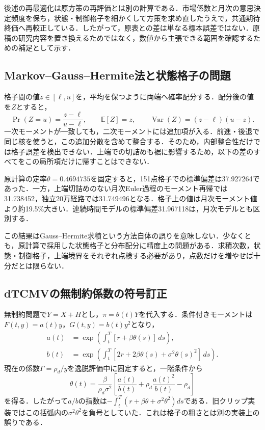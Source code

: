 \documentclass[10pt,a4paper]{article}
\theoremstyle{plain}
\theoremstyle{definition}
\newcommand{\E}{\mathbb{E}}
\DeclareMathOperator{\Var}{Var}
\begin{document}
後述の再最適化は原方策の再評価とは別の計算である．市場係数と月次の意思決定頻度を保ち，状態・制御格子を細かくして方策を求め直したうえで，共通期待終価へ再較正している．したがって，原表との差は単なる標本誤差ではない．原稿の研究内容を置き換えるためではなく，数値から主張できる範囲を確認するための補足として示す．

\subsection{Markov--Gauss--Hermite法と状態格子の問題}
格子間の値$z\in[\ell,u]$を，平均を保つように両端へ確率配分する．配分後の値を$Z$とすると，
\begin{equation}
\Pr(Z=u)=\frac{z-\ell}{u-\ell},\qquad
\E[Z]=z,\qquad \Var(Z)=(z-\ell)(u-z).
\end{equation}
一次モーメントが一致しても，二次モーメントには追加項が入る．前進・後退で同じ核を使うと，この追加分散を含めて整合する．そのため，内部整合性だけでは格子誤差を検出できない．上端での切詰めも裾に影響するため，以下の差のすべてをこの局所項だけに帰すことはできない．

原計算の定率$\theta=0.4694735$を固定すると，151点格子での標準偏差は37.927264であった．一方，上端切詰めのない月次Euler過程のモーメント再帰では31.738452，独立20万経路では31.749496となる．格子上の値は月次モーメント値より約19.5\%大きい．連続時間モデルの標準偏差31.967118は，月次モデルとも区別する．

この結果はGauss--Hermite求積という方法自体の誤りを意味しない．少なくとも，原計算で採用した状態格子と分布配分に精度上の問題がある．求積次数，状態・制御格子，上端境界をそれぞれ点検する必要があり，点数だけを増やせば十分だとは限らない．

\subsection{dTCMVの無制約係数の符号訂正}
無制約問題で$Y=X+H$とし，$\pi=\theta(t)Y$を代入する．条件付きモーメントは$F(t,y)=a(t)y$，$G(t,y)=b(t)y^2$となり，
\begin{align}
a(t)&=\exp\!\left(\int_t^T[r+\beta\theta(s)]\,ds\right),\\
b(t)&=\exp\!\left(\int_t^T[2r+2\beta\theta(s)+\sigma^2\theta(s)^2]\,ds\right).
\end{align}
現在の係数$\Gamma=\rho_d/y$を逸脱評価中に固定すると，一階条件から
\begin{equation}
\theta(t)=\frac{\beta}{\rho_d\sigma^2}
\left[\frac{a(t)}{b(t)}+\rho_d\frac{a(t)^2}{b(t)}-\rho_d\right]
\end{equation}
を得る．したがって$a/b$の指数は$-\int_t^T(r+\beta\theta+\sigma^2\theta^2)ds$である．旧クリップ実装ではこの括弧内の$\sigma^2\theta^2$を負号としていた．これは格子の粗さとは別の実装上の誤りである．
\end{document}
